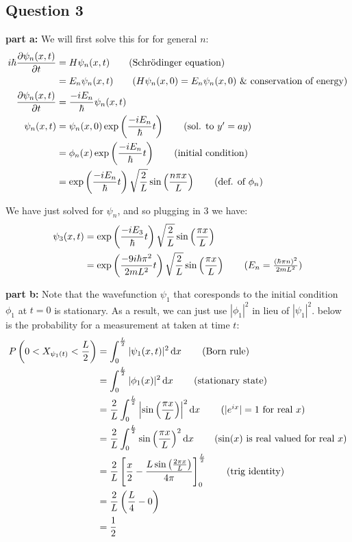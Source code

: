 \documentclass{article}
\renewcommand{\eval}[3]{\left[#1\right]_{#2}^{#3}}
\begin{document}
\subsection*{Question 3}
\noindent\textbf{part a:} We will first solve this for for general $n$:
\begin{align*}
    i\hbar\pdv{\psi_n(x,t)}{t}&=H\psi_n(x,t)\tag{Schrödinger equation}\\
    &=E_n\psi_n(x,t)\tag{$H\psi_n(x,0)=E_n\psi_n(x,0)$ \& conservation of energy}\\
    \pdv{\psi_n(x,t)}{t}&=\frac{-iE_n}{\hbar}\psi_n(x,t)\\
    \psi_n(x,t)&=\psi_n(x,0)\exp\left(\frac{-iE_n}{\hbar}t\right)\tag{sol. to $y'=ay$}\\
    &=\phi_n(x)\exp\left(\frac{-iE_n}{\hbar}t\right)\tag{initial condition}\\
    &=\exp\left(\frac{-iE_n}{\hbar}t\right)\sqrt{\frac{2}{L}}\sin\left(\frac{n\pi x}{L}\right)\tag{def. of $\phi_n$}
\end{align*}

We have just solved for $\psi_n$, and so plugging in 3 we have:
\begin{align*}
    \psi_3(x,t)&=\exp\left(\frac{-iE_3}{\hbar}t\right)\sqrt{\frac{2}{L}}\sin\left(\frac{\pi x}{L}\right)\\
    &=\exp\left(\frac{-9i\hbar\pi^2}{2mL^2}t\right)\sqrt{\frac{2}{L}}\sin\left(\frac{\pi x}{L}\right)\tag{$E_n=\frac{(\hbar\pi n)^2}{2mL^2}$}\\
\end{align*}
\bigskip

\noindent\textbf{part b:} Note that the wavefunction $\psi_1$ that coresponds to the initial condition $\phi_1$ at $t=0$ is stationary. As a result, we can just use $|\phi_1|^2$ in lieu of $|\psi_1|^2$. below is the probability for a measurement at taken at time $t$:
\begin{align*}
    P\left(0<X_{\psi_1(t)}<\frac{L}{2}\right)&=\int_0^{\frac{L}{2}}|\psi_1(x,t)|^2\dd{x}\tag{Born rule}\\
    &=\int_0^{\frac{L}{2}}|\phi_1(x)|^2\dd{x}\tag{stationary state}\\
    &=\frac{2}{L}\int_0^{\frac{L}{2}}\left|\sin\left(\frac{\pi x}{L}\right)\right|^2\dd{x}\tag{$|e^{ix}|=1$ for real $x$}\\
    &=\frac{2}{L}\int_0^{\frac{L}{2}}\sin\left(\frac{\pi x}{L}\right)^2\dd{x}\tag{$\sin(x)$ is real valued for real $x$}\\
    &=\frac{2}{L}\eval{\frac{x}{2}-\frac{L\sin\left(\frac{2\pi x}{L}\right)}{4\pi}}{0}{\frac{L}{2}}\tag{trig identity}\\
    &=\frac{2}{L}\left(\frac{L}{4}-0\right)\\
    &=\frac{1}{2}
\end{align*}
\bigskip
\end{document}
